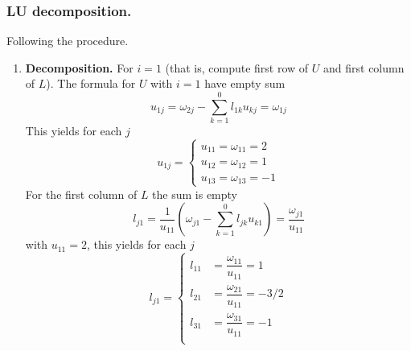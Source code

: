 \documentclass[../../../main.tex]{subfiles}
\begin{document}
\subsubsection{LU decomposition.}
Following the procedure.
\begin{enumerate}
    \item \textbf{Decomposition.}
          For $i=1$ (that is, compute first row of $U$ and first column of $L$).
          The formula for $U$ with $i=1$ have empty sum
          \begin{equation*}
              u_{1j}=\omega_{2j}-\sum_{k=1 }^{0}l_{1k}u_{kj}=\omega_{1j}
          \end{equation*}
          This yields for each $j$
          \begin{equation*}
              u_{1j} =
              \begin{cases}
                  u_{11}=\omega_{11}=2 \\
                  u_{12}=\omega_{12}=1 \\
                  u_{13}=\omega_{13}=-1
              \end{cases}
          \end{equation*}
          For the first column of $L$ the sum is empty
          \begin{equation*}
              l_{j1}=\frac{1 }{u_{11}}\left( \omega_{j1}-\sum_{k=1}^{ 0 }l_{jk}u_{k1} \right) =\frac{\omega_{j1 }}{u_{11}}
          \end{equation*}
          with $u_{11}=2$, this yields for each $j$
          \begin{equation*}
              l_{j1} =
              \begin{cases}
                  l_{11} & = \dfrac{\omega_{11 }}{u_{11}}=1    \\[8pt]
                  l_{21} & = \dfrac{\omega_{21 }}{u_{11}}=-3/2 \\[8pt]
                  l_{31} & = \dfrac{\omega_{31 }}{u_{11}}=-1   \\[8pt]
              \end{cases}
          \end{equation*}


\end{enumerate}
\end{document}
